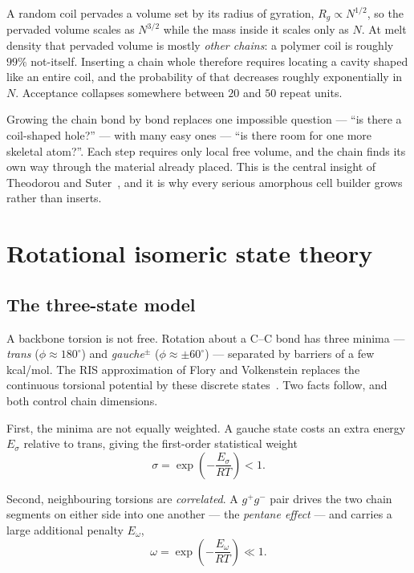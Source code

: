 \documentclass[11pt,a4paper]{article}
\begin{document}
A random coil pervades a volume set by its radius of gyration,
$R_g \propto N^{1/2}$, so the pervaded volume scales as $N^{3/2}$ while the
mass inside it scales only as $N$. At melt density that pervaded volume is
mostly \emph{other chains}: a polymer coil is roughly $99\%$ not-itself.
Inserting a chain whole therefore requires locating a cavity shaped like an
entire coil, and the probability of that decreases roughly exponentially in
$N$. Acceptance collapses somewhere between $20$ and $50$ repeat units.

Growing the chain bond by bond replaces one impossible question --- ``is there
a coil-shaped hole?'' --- with many easy ones --- ``is there room for one more
skeletal atom?''. Each step requires only local free volume, and the chain
finds its own way through the material already placed. This is the central
insight of Theodorou and Suter~\cite{ts1985}, and it is why every serious
amorphous cell builder grows rather than inserts.

\section{Rotational isomeric state theory}
\label{sec:ris}

\subsection{The three-state model}

A backbone torsion is not free. Rotation about a C--C bond has three minima
--- \emph{trans} ($\phi \approx 180^\circ$) and \emph{gauche}$^{\pm}$
($\phi \approx \pm 60^\circ$) --- separated by barriers of a few kcal/mol. The
RIS approximation of Flory and Volkenstein replaces the continuous torsional
potential by these discrete states~\cite{flory1969,mattice1994}. Two facts
follow, and both control chain dimensions.

First, the minima are not equally weighted. A gauche state costs an extra
energy $E_\sigma$ relative to trans, giving the first-order statistical weight
\begin{equation}
  \sigma = \exp\!\left(-\frac{E_\sigma}{RT}\right) < 1 .
  \label{eq:sigma}
\end{equation}

Second, neighbouring torsions are \emph{correlated}. A $g^{+}g^{-}$ pair
drives the two chain segments on either side into one another --- the
\emph{pentane effect} --- and carries a large additional penalty $E_\omega$,
\begin{equation}
  \omega = \exp\!\left(-\frac{E_\omega}{RT}\right) \ll 1 .
  \label{eq:omega}
\end{equation}
\end{document}
